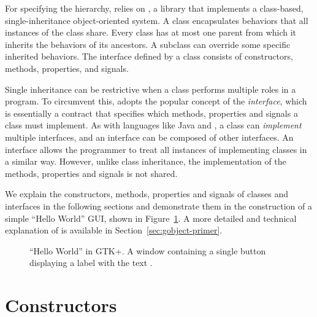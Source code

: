 For specifying the hierarchy,  relies on , a
 library that implements a class-based, single-inheritance
object-oriented system. A  class encapsulates behaviors
that all instances of the class share. Every class has at most one
parent from which it inherits the behaviors of its ancestors. A
subclass can override some specific inherited behaviors. The interface
defined by a class consists of constructors, methods, properties,
and signals. 

Single inheritance can be restrictive when a class performs multiple
roles in a program. To circumvent this,  adopts the popular
concept of the \textit{interface}, which is essentially a contract
that specifies which methods, properties and signals a class must
implement. As with languages like Java and , a class can
\textit{implement} multiple interfaces, and an interface can be
composed of other interfaces. An interface allows the programmer to
treat all instances of implementing classes in a similar way. However,
unlike class inheritance, the implementation of the methods,
properties and signals is not shared.

We explain the constructors, methods, properties and signals of
classes and interfaces in the following sections and demonstrate them
in the construction of a simple ``Hello World'' GUI, shown in
Figure~\ref{fig:hello-world}. A more detailed and technical
explanation of  is available in
Section~\ref{sec:gobject-primer}.

\begin{figure}[h!tbp]
  \begin{center}
    \caption{\label{fig:hello-world}``Hello World'' in GTK+. 
      A window containing a single button displaying a label with the text
      .}
  \end{center}
\end{figure}

\section{Constructors}

